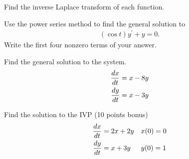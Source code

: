 \documentclass[12pt]{exam}
\begin{document}
\begin{questions}
\clearpage

\question[16]
Find the inverse Laplace transform of each function.
\clearpage

\question[14]
Use the power series method to find the general solution to
\begin{align*}
\left( \cos t \right) y^{\prime} + y = 0.
\end{align*}
Write the first four nonzero terms of your answer.
\clearpage

\question[16]
Find the general solution to the system.
\begin{align*}
\dfrac{dx}{dt} & = x - 8y \smallskip \\
\dfrac{dy}{dt} & = x - 3y
\end{align*}
\clearpage

\question
Find the solution to the IVP (10 points bonus)
\begin{align*}
\dfrac{dx}{dt} & = 2x + 2y && x(0) = 0 \smallskip \\
\dfrac{dy}{dt} & = x + 3y && y(0) = 1
\end{align*}
\clearpage

\end{questions}
\end{document}
